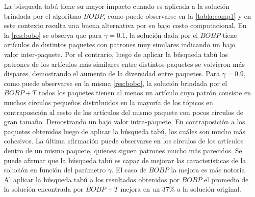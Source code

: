 La búsqueda tabú tiene su mayor impacto cuando es aplicada a la solución brindada por el algoritmo $BOBP$, como puede observarse en la \autoref{tabla:comp1} y en este contexto resulta una buena alternativa por su bajo costo computacional. En la \autoref{res:bobo} se observa que para $\gamma=0.1$, la solución dada por el $BOBP$ tiene artículos de distintos paquetes con patrones muy similares indicando un bajo valor inter-paquete. Por el contrario, luego de aplicar la búsqueda tabú los patrones de los artículos más similares entre distintos paquetes se volvieron más dispares, demostrando el aumento de la diversidad entre paquetes. Para $\gamma=0.9$, como puede observarse en la misma \autoref{res:bobo}, la solución brindada por el $BOBP+T$ todos los paquetes tienen al menos un artículo cuyo patrón consiste en muchos círculos pequeños distribuidos en la mayoría de los tópicos en contraposición al resto de los artículos del mismo paquete con pocos círculos de gran tamaño. Demostrando un bajo valor intra-paquete. En contraposición a los paquetes obtenidos luego de aplicar la búsqueda tabú, los cuáles son mucho más cohesivos. La última afirmación puede observarse en los círculos de los artículos dentro de un mismo paquete, quienes siguen patrones mucho más parecidos. Se puede afirmar que la búsqueda tabú es capaz de mejorar las características de la solución en función del parámetro $\gamma$. El caso de $BOBP$ la mejora es más notoria. Al aplicar la búsqueda tabú a los resultados obtenidos por $BOBP$ el promedio de la solución encontrada por $BOBP+T$ mejora en un $37\%$ a la solución original. 

